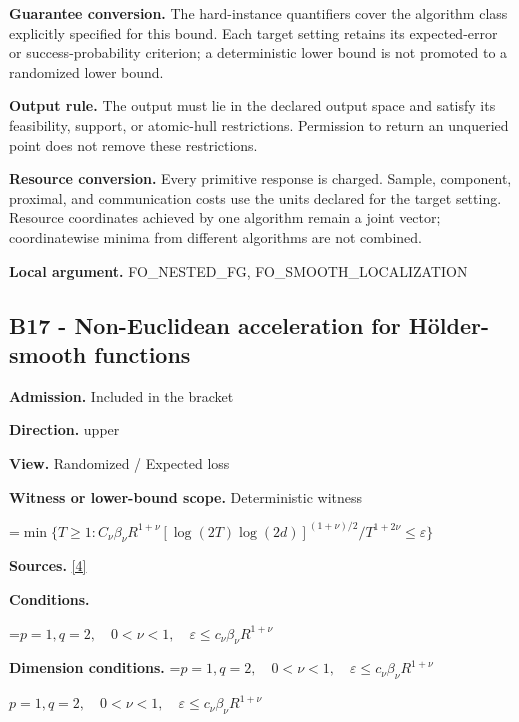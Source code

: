 \documentclass[10pt,a4paper]{article}
\newcommand{\AtlasMath}[1]{\par\begingroup\centering\setbox0=\hbox{$\displaystyle #1$}\ifdim\wd0>1.4\linewidth\typeout{ATLAS WIDE FORMULA: \the\wd0}\fi\ifdim\wd0>\linewidth\resizebox{\linewidth}{!}{\box0}\else\box0\fi\par\endgroup}
\newcommand{\AtlasInlineMath}[1]{\begingroup\setbox0=\hbox{$#1$}\ifdim\wd0>.4\linewidth\endgroup\AtlasMath{#1}\else\endgroup$#1$\fi}
\begin{document}
\textbf{Guarantee conversion.} The hard-instance quantifiers cover the algorithm class explicitly specified for this bound. Each target setting retains its expected-error or success-probability criterion; a deterministic lower bound is not promoted to a randomized lower bound.



\textbf{Output rule.} The output must lie in the declared output space and satisfy its feasibility, support, or atomic-hull restrictions. Permission to return an unqueried point does not remove these restrictions.



\textbf{Resource conversion.} Every primitive response is charged. Sample, component, proximal, and communication costs use the units declared for the target setting. Resource coordinates achieved by one algorithm remain a joint vector; coordinatewise minima from different algorithms are not combined.



\textbf{Local argument.} FO\_NESTED\_FG, FO\_SMOOTH\_LOCALIZATION



\subsection{B17 - Non-Euclidean acceleration for Hölder-smooth functions}


\textbf{Admission.} Included in the bracket



\textbf{Direction.} upper



\textbf{View.} Randomized / Expected loss



\textbf{Witness or lower-bound scope.} Deterministic witness



\AtlasMath{\min\{T\ge1:C_\nu\beta_\nu R^{1+\nu}[\log(2T)\log(2d)]^{(1+\nu)/2}/T^{1+2\nu}\le\varepsilon\}}


\textbf{Sources.} \href{https://arxiv.org/pdf/2609.32910}{[4]}



\textbf{Conditions.}
\AtlasMath{p=1,q=2,\quad0<\nu<1,\quad\varepsilon\le c_\nu\beta_\nu R^{1+\nu}}




\textbf{Dimension conditions.} \AtlasInlineMath{p=1,q=2,\quad0<\nu<1,\quad\varepsilon\le c_\nu\beta_\nu R^{1+\nu}}
\end{document}

